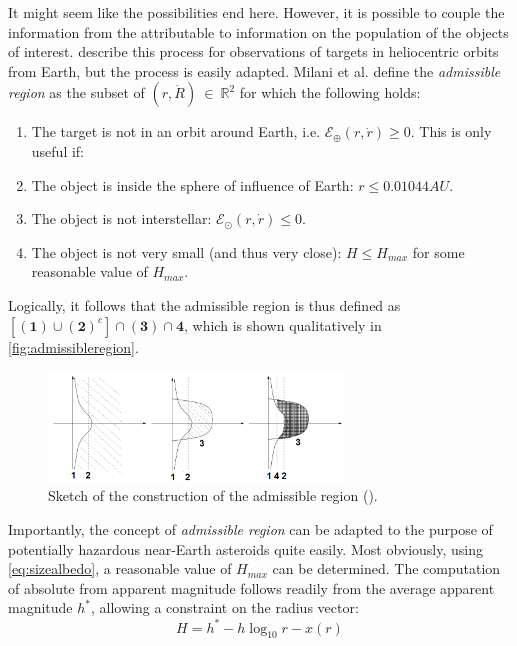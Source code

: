 It might seem like the possibilities end here. However, it is possible to couple the information from the attributable to information on the population of the objects of interest. \cite{veryshortarcs} describe this process for observations of targets in heliocentric orbits from Earth, but the process is easily adapted. Milani et al. define the \textit{admissible region} as the subset of $(r, \dot{R})~\in~\mathbb{R}^2$ for which the following holds:
\begin{enumerate}
    \item The target is not in an orbit around Earth, i.e. $\mathcal{E}_\oplus (r, \dot{r}) \geq 0$. This is only useful if:
    \item The object is inside the sphere of influence of Earth: $r \leq 0.01044 AU$.
    \item The object is not interstellar: $\mathcal{E}_\odot (r, \dot{r}) \leq 0$.
    \item The object is not very small (and thus very close): $H \leq H_{max}$ for some reasonable value of $H_{max}$.
\end{enumerate}
Logically, it follows that the admissible region is thus defined as $\left[ (\mathbf{1}) \cup (\mathbf{2})^c\right] \cap (\mathbf{3}) \cap \mathbf{4}$, which is shown qualitatively in \autoref{fig:admissibleregion}.
\begin{figure}[htbp]
    \centering
    \includegraphics[width=0.7\textwidth]{images/admissibleregoin.png}
    \caption{Sketch of the construction of the admissible region (\cite{classicmodernorbits}).}
    \label{fig:admissibleregion}
\end{figure}
Importantly, the concept of \textit{admissible region} can be adapted to the purpose of potentially hazardous near-Earth asteroids quite easily. Most obviously, using \autoref{eq:sizealbedo}, a reasonable value of $H_{max}$ can be determined. The computation of absolute from apparent magnitude follows readily from the average apparent magnitude $h^{*}$, allowing a constraint on the radius vector:
\begin{equation}
    H = h^* - h \log_{10} r - x(r)
\end{equation}
